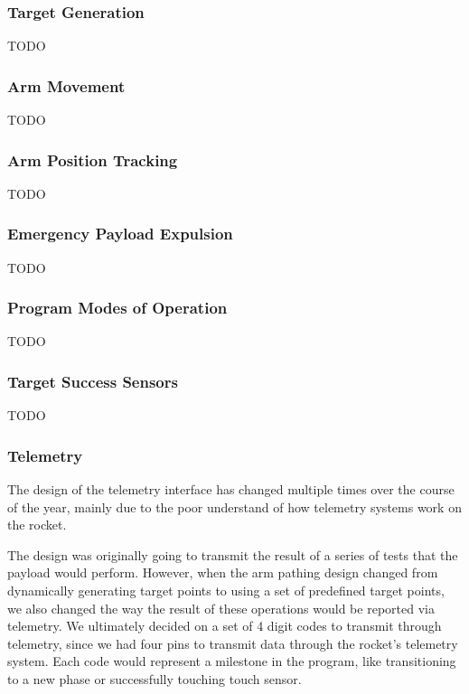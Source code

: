 \subsubsection{Target Generation}
TODO

\subsubsection{Arm Movement}
TODO

\subsubsection{Arm Position Tracking}
TODO

\subsubsection{Emergency Payload Expulsion}
TODO

\subsubsection{Program Modes of Operation}
TODO

\subsubsection{Target Success Sensors}
TODO

\subsubsection{Telemetry}
The design of the telemetry interface has changed multiple times over the
course of the year, mainly due to the poor understand of how telemetry systems
work on the rocket.

The design was originally going to transmit the result of a series of tests
that the \gls{payload} would perform.
However, when the arm pathing design changed from dynamically generating target 
points to using a set of predefined target points, we also changed the way the
result of these operations would be reported via telemetry.
We ultimately decided on a set of 4 digit codes to transmit through telemetry,
since we had four pins to transmit data through the rocket's telemetry system.
Each code would represent a milestone in the program, like transitioning to a
new phase or successfully touching touch sensor.

